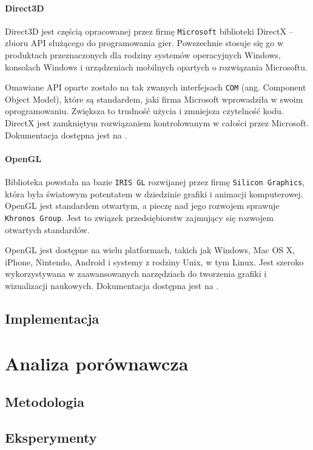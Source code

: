 \documentclass[11pt]{mwrep}
\begin{document}
      \subsubsection{Direct3D}

      Direct3D jest częścią opracowanej przez firmę \texttt{Microsoft} biblioteki DirectX -- zbioru API służącego do programowania gier. Powszechnie stosuje się go w produktach przeznaczonych dla rodziny systemów operacyjnych Windows, konsolach Windows i urządzeniach mobilnych opartych o rozwiązania Microsoftu.
 
      Omawiane API oparte zostało na tak zwanych interfejsach \texttt{COM} (ang. Component Object Model), które są standardem, jaki firma Microsoft wprowadziła w swoim oprogramowaniu. Zwiększa to trudność użycia i zmniejsza czytelność kodu. DirectX jest zamkniętym rozwiązaniem kontrolowanym w całości przez Microsoft. Dokumentacja dostępna jest na \cite{dx}.

      \subsubsection{OpenGL}

      Biblioteka powstała na bazie \texttt{IRIS GL} rozwijanej przez firmę \texttt{Silicon Graphics}, która była światowym potentatem w dziedzinie grafiki i animacji komputerowej. OpenGL jest standardem otwartym, a pieczę nad jego rozwojem sprawuje \texttt{Khronos Group}. Jest to związek przedsiębiorstw zajmujący się rozwojem otwartych standardów.

      OpenGL jest dostępne na wielu platformach, takich jak Windows, Mac OS X, iPhone, Nintendo, Android i systemy z rodziny Unix, w tym Linux. Jest szeroko wykorzystywana w zaawansowanych narzędziach do tworzenia grafiki i wizualizacji naukowych. Dokumentacja dostępna jest na \cite{opengl}.

  \section{Implementacja}

\chapter{Analiza porównawcza}
  \section{Metodologia}
  \section{Eksperymenty}
\end{document}
